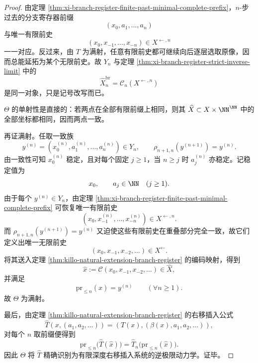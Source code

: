 \begin{proof}
由定理 \ref{thm:xi-branch-register-finite-past-minimal-complete-prefix}，\(n\)-步过去的分支寄存器前缀
\[
(x_0,a_1,\dots,a_n)
\]
与唯一有限前史
\[
(x_0,x_{-1},\dots,x_{-n})\in X^{\leftarrow,n}
\]
一一对应。反过来，由 \(T\) 为满射，任意有限前史都可继续向后逐层选取原像，因而总能延拓为某个无限前史。故 \(Y_n\) 与定理 \ref{thm:xi-branch-register-strict-inverse-limit} 中的
\[
\widehat X_n^{\mathrm{br}}=\mathcal C_n(X^{\leftarrow,n})
\]
是同一对象，只是记号改写而已。

\(\Theta\) 的单射性是直接的：若两点在全部有限前缀上相同，则其 \(\widehat X\subset X\times\NN^\NN\) 中的全部坐标都相同，因而两点一致。

再证满射。任取一致族
\[
y^{(n)}=(x_0^{(n)},a_1^{(n)},\dots,a_n^{(n)})\in Y_n,
\qquad
\rho_{n+1,n}(y^{(n+1)})=y^{(n)}.
\]
由一致性可知 \(x_0^{(n)}\) 稳定，且对每个固定 \(j\ge 1\)，当 \(n\ge j\) 时 \(a_j^{(n)}\) 亦稳定。记稳定值为
\[
x_0,\qquad a_j\in\NN\quad (j\ge 1).
\]
由于每个 \(y^{(n)}\in Y_n\)，由定理 \ref{thm:xi-branch-register-finite-past-minimal-complete-prefix} 可恢复唯一有限前史
\[
(x_0,x_{-1}^{(n)},\dots,x_{-n}^{(n)})\in X^{\leftarrow,n}.
\]
而 \(\rho_{n+1,n}(y^{(n+1)})=y^{(n)}\) 又迫使这些有限前史在重叠部分完全一致，故它们定义出唯一无限前史
\[
(x_0,x_{-1},x_{-2},\dots)\in X^{\leftarrow}.
\]
将其送入定理 \ref{thm:killo-natural-extension-branch-register} 的编码映射，得到
\[
\widehat x:=\mathcal C(x_0,x_{-1},x_{-2},\dots)\in \widehat X,
\]
并满足
\[
\mathrm{pr}_{\le n}(\widehat x)=y^{(n)}\qquad(\forall n\ge 1).
\]
故 \(\Theta\) 为满射。

最后，由定理 \ref{thm:killo-natural-extension-branch-register} 的右移插入公式
\[
\widehat T(x,(a_1,a_2,\dots))=(T(x),(\beta(x),a_1,a_2,\dots)),
\]
对每个 \(n\) 取前缀便得到
\[
\mathrm{pr}_{\le n}\!\bigl(\widehat T(\widehat x)\bigr)
=
\widehat T_n\!\bigl(\mathrm{pr}_{\le n}(\widehat x)\bigr).
\]
因此 \(\Theta\) 将 \(\widehat T\) 精确识别为有限深度右移插入系统的逆极限动力学。证毕。
\end{proof}

